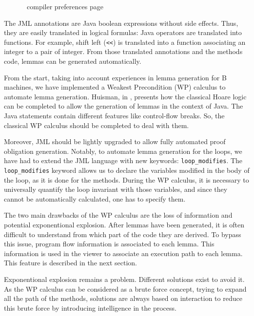 \begin{figure}[p]
 \caption{\sc \JACK\ compiler preferences page}
 \label{JACKcompprefpage}
\end{figure}
 The JML annotations are Java boolean expressions without side
 effects.  Thus, they are easily translated in logical formulas: Java operators are
 translated into functions. For example, shift left (\texttt{<<}) is
 translated into a function associating an integer to a pair of
 integer.  From those translated annotations and the methods code,
 lemmas can be generated automatically.

 From the start, taking into account
 experiences in lemma generation for B machines, we have implemented a Weakest Precondition (WP) calculus to automate lemma
 generation.  Huisman, in \cite{Huisman:PhD}, presents how the
 classical Hoare logic can be completed to allow the generation of
 lemmas in the context of Java.  The Java statements contain different
 features like control-flow breaks.  So, the classical WP calculus
 should be completed to deal with them.

 Moreover, JML should be lightly upgraded to allow fully automated proof obligation generation.
 Notably, to
 automate lemma generation for the loops, we have had to extend
 the JML language with new keywords: \texttt{loop\_modifies}.
 The \texttt{loop\_modifies} keyword allows us to declare the variables modified in
the body of the loop, as it is done for the methods. During the WP calculus, it is necessary to universally
quantify the loop invariant with those variables, and since they cannot be automatically calculated, one has to
specify them.
 
 The two main drawbacks of the WP calculus are the loss of information and
 potential exponentional explosion.  After lemmas have been generated,
 it is often difficult to understand from which part of the code they
 are derived.  To bypass this issue, program flow information is
 associated to each lemma.  This information is used in the viewer
 to associate an execution path to each lemma. This feature is described in the next section.

 Exponentional explosion remains a problem.  Different solutions exist
 to avoid it.  As the WP calculus can be considered as a brute
 force concept, trying to expand all the path of the methods,
 solutions are always based on interaction to reduce this brute force
 by introducing intelligence in the process.

